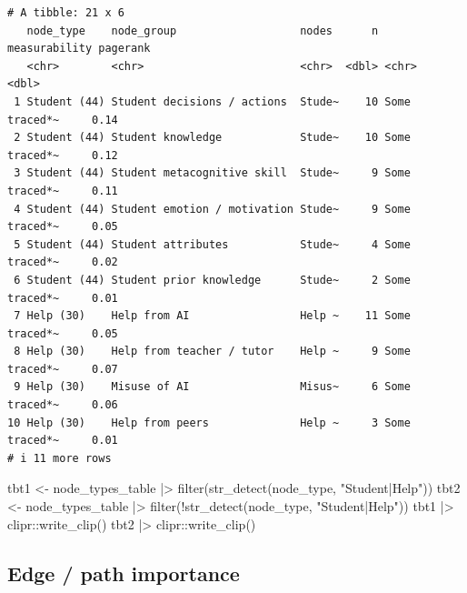 \documentclass[
  letterpaper,
  DIV=11,
  numbers=noendperiod]{scrartcl}
\newenvironment{Shaded}{\begin{snugshade}}{\end{snugshade}}
\newcommand{\FunctionTok}[1]{\textcolor[rgb]{0.28,0.35,0.67}{#1}}
\newcommand{\NormalTok}[1]{\textcolor[rgb]{0.00,0.23,0.31}{#1}}
\newcommand{\OtherTok}[1]{\textcolor[rgb]{0.00,0.23,0.31}{#1}}
\newcommand{\SpecialCharTok}[1]{\textcolor[rgb]{0.37,0.37,0.37}{#1}}
\newcommand{\StringTok}[1]{\textcolor[rgb]{0.13,0.47,0.30}{#1}}
\begin{document}
\begin{verbatim}
# A tibble: 21 x 6
   node_type    node_group                   nodes      n measurability pagerank
   <chr>        <chr>                        <chr>  <dbl> <chr>            <dbl>
 1 Student (44) Student decisions / actions  Stude~    10 Some traced*~     0.14
 2 Student (44) Student knowledge            Stude~    10 Some traced*~     0.12
 3 Student (44) Student metacognitive skill  Stude~     9 Some traced*~     0.11
 4 Student (44) Student emotion / motivation Stude~     9 Some traced*~     0.05
 5 Student (44) Student attributes           Stude~     4 Some traced*~     0.02
 6 Student (44) Student prior knowledge      Stude~     2 Some traced*~     0.01
 7 Help (30)    Help from AI                 Help ~    11 Some traced*~     0.05
 8 Help (30)    Help from teacher / tutor    Help ~     9 Some traced*~     0.07
 9 Help (30)    Misuse of AI                 Misus~     6 Some traced*~     0.06
10 Help (30)    Help from peers              Help ~     3 Some traced*~     0.01
# i 11 more rows
\end{verbatim}

\begin{Shaded}
\begin{Highlighting}[]
\NormalTok{tbt1 }\OtherTok{\textless{}{-}}\NormalTok{ node\_types\_table }\SpecialCharTok{|\textgreater{}} \FunctionTok{filter}\NormalTok{(}\FunctionTok{str\_detect}\NormalTok{(node\_type, }\StringTok{"Student|Help"}\NormalTok{))}
\NormalTok{tbt2 }\OtherTok{\textless{}{-}}\NormalTok{ node\_types\_table }\SpecialCharTok{|\textgreater{}} \FunctionTok{filter}\NormalTok{(}\SpecialCharTok{!}\FunctionTok{str\_detect}\NormalTok{(node\_type, }\StringTok{"Student|Help"}\NormalTok{))}
\NormalTok{tbt1 }\SpecialCharTok{|\textgreater{}}\NormalTok{ clipr}\SpecialCharTok{::}\FunctionTok{write\_clip}\NormalTok{()}
\NormalTok{tbt2 }\SpecialCharTok{|\textgreater{}}\NormalTok{ clipr}\SpecialCharTok{::}\FunctionTok{write\_clip}\NormalTok{()}
\end{Highlighting}
\end{Shaded}

\subsection{Edge / path importance}\label{edge-path-importance}
\end{document}
